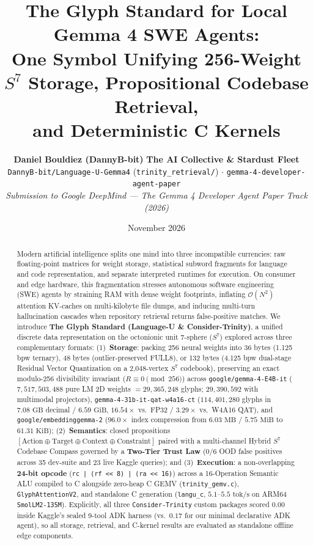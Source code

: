 \documentclass[10pt,twocolumn,letterpaper]{article}
\title{\LARGE \textbf{The Glyph Standard for Local Gemma 4 SWE Agents:\\
One Symbol Unifying 256-Weight $S^7$ Storage, Propositional Codebase Retrieval,\\
and Deterministic C Kernels}}
\author{
  \textbf{Daniel Bouldiez (DannyB-bit)} \quad \textbf{The AI Collective \& Stardust Fleet}\\
  \small \texttt{DannyB-bit/Language-U-Gemma4} (\texttt{trinity\_retrieval/}) $\cdot$ \texttt{gemma-4-developer-agent-paper}\\
  \small \textit{Submission to Google DeepMind --- The Gemma 4 Developer Agent Paper Track (2026)}
}
\date{November 2026}
\begin{document}
\maketitle

\begin{abstract}
Modern artificial intelligence splits one mind into three incompatible currencies: raw floating-point matrices for weight storage, statistical subword fragments for language and code representation, and separate interpreted runtimes for execution. On consumer and edge hardware, this fragmentation stresses autonomous software engineering (SWE) agents by straining RAM with dense weight footprints, inflating $\mathcal{O}(N^2)$ attention KV-caches on multi-kilobyte file dumps, and inducing multi-turn hallucination cascades when repository retrieval returns false-positive matches. We introduce \textbf{The Glyph Standard (Language-U \& Consider-Trinity)}, a unified discrete data representation on the octonionic unit 7-sphere ($S^7$) explored across three complementary formats: (1)~\textbf{Storage}: packing 256 neural weights into 36 bytes (1.125 bpw ternary), 48 bytes (outlier-preserved FULL8), or 132 bytes (4.125 bpw dual-stage Residual Vector Quantization on a 2,048-vertex $S^7$ codebook), preserving an exact modulo-256 divisibility invariant ($R \equiv 0 \pmod{256}$) across \texttt{google/gemma-4-E4B-it} ($7,517,503,488$ pure LM 2D weights $= 29,365,248$ glyphs; $29,390,592$ with multimodal projectors), \texttt{gemma-4-31b-it-qat-w4a16-ct} ($114,401,280$ glyphs in $7.08\text{ GB}$ decimal / $6.59\text{ GiB}$, $16.54\times$ vs.\ FP32 / $3.29\times$ vs.\ W4A16 QAT), and \texttt{google/embeddinggemma-2} ($96.0\times$ index compression from $6.03\text{ MB}$ / $5.75\text{ MiB}$ to $61.31\text{ KiB}$); (2)~\textbf{Semantics}: closed propositions $[\text{Action} \oplus \text{Target} \oplus \text{Context} \oplus \text{Constraint}]$ paired with a multi-channel Hybrid $S^7$ Codebase Compass governed by a \textbf{Two-Tier Trust Law} ($0/6$ OOD false positives across 35 dev-suite and 23 live Kaggle queries); and (3)~\textbf{Execution}: a non-overlapping \textbf{24-bit opcode} (\texttt{rc | (rf << 8) | (ra << 16)}) across a 16-Operation Semantic ALU compiled to C alongside zero-heap C GEMV (\texttt{trinity\_gemv.c}), \texttt{GlyphAttentionV2}, and standalone C generation (\texttt{langu\_c}, $5.1\text{--}5.5\text{ tok/s}$ on ARM64 \texttt{SmolLM2-135M}). Explicitly, all three \texttt{Consider-Trinity} custom packages scored $0.00$ inside Kaggle's sealed 9-tool ADK harness (vs.\ $0.17$ for our minimal declarative ADK agent), so all storage, retrieval, and C-kernel results are evaluated as standalone offline edge components.
\end{abstract}
\end{document}
